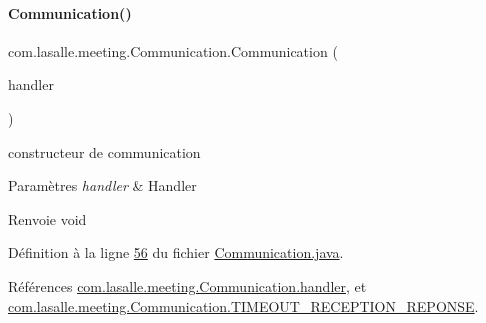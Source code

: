 \paragraph{\texorpdfstring{Communication()}{Communication()}\hspace{0.1cm}{\footnotesize\ttfamily [1/2]}}
{\footnotesize\ttfamily com.\+lasalle.\+meeting.\+Communication.\+Communication (\begin{DoxyParamCaption}\item[{Handler}]{handler }\end{DoxyParamCaption})}



constructeur de communication 


\begin{DoxyParams}{Paramètres}
{\em handler} & Handler \\
\hline
\end{DoxyParams}
\begin{DoxyReturn}{Renvoie}
void 
\end{DoxyReturn}


Définition à la ligne \hyperlink{_communication_8java_source_l00056}{56} du fichier \hyperlink{_communication_8java_source}{Communication.\+java}.



Références \hyperlink{_communication_8java_source_l00039}{com.\+lasalle.\+meeting.\+Communication.\+handler}, et \hyperlink{_communication_8java_source_l00031}{com.\+lasalle.\+meeting.\+Communication.\+T\+I\+M\+E\+O\+U\+T\+\_\+\+R\+E\+C\+E\+P\+T\+I\+O\+N\+\_\+\+R\+E\+P\+O\+N\+SE}.


